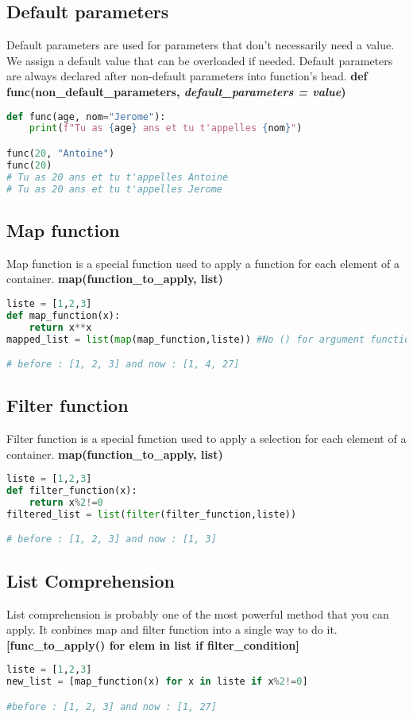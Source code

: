 \documentclass[a4paper, 12pt, titlepage]{scrartcl} %
\begin{document}
\subsection{Default parameters}
Default parameters are used for parameters that don't necessarily need a value. We assign a default value that can be overloaded if needed. Default parameters are always declared after non-default parameters into function's head. \textbf{def func(non\_default\_parameters, \textit{default\_parameters = value})}

\begin{lstlisting}[language=Python]
def func(age, nom="Jerome"):
	print(f"Tu as {age} ans et tu t'appelles {nom}")

func(20, "Antoine")
func(20)
# Tu as 20 ans et tu t'appelles Antoine
# Tu as 20 ans et tu t'appelles Jerome

\end{lstlisting}

\subsection{Map function}
Map function is a special function used to apply a function for each element of a container. \textbf{map(function\_to\_apply, list)}
\begin{lstlisting}[language=Python]
liste = [1,2,3]
def map_function(x):
	return x**x
mapped_list = list(map(map_function,liste)) #No () for argument function

# before : [1, 2, 3] and now : [1, 4, 27]
\end{lstlisting}

\subsection{Filter function}
Filter function is a special function used to apply a selection for each element of a container. \textbf{map(function\_to\_apply, list)}
\begin{lstlisting}[language=Python]
liste = [1,2,3]
def filter_function(x):
	return x%2!=0
filtered_list = list(filter(filter_function,liste))

# before : [1, 2, 3] and now : [1, 3]
\end{lstlisting}

\subsection{List Comprehension}
List comprehension is probably one of the most powerful method that you can apply. It conbines map and filter function into a single way to do it. \textbf{[func\_to\_apply() for elem in list if filter\_condition]}
\label{subsec:ListComprehension}
\begin{lstlisting}[language=Python]
liste = [1,2,3]
new_list = [map_function(x) for x in liste if x%2!=0]

#before : [1, 2, 3] and now : [1, 27]
\end{lstlisting}
\end{document}
